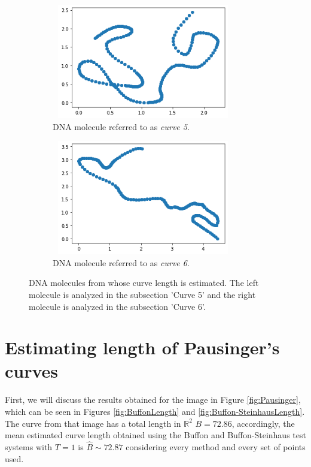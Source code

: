 \begin{figure}[h!]
  \begin{center}
  \begin{subfigure}[h!]{80mm}
    \includegraphics[width=80mm, height=50mm]{Figuras/Curva5.png}\par
    \caption{DNA molecule referred to as \textit{curve 5}.}
    \label{fig:Curva5}
  \end{subfigure}
  \hfill
  \begin{subfigure}[h!]{80mm}
    \includegraphics[width=80mm, height=50mm]{Figuras/Curva6.png}\par
    \caption{DNA molecule referred to as \textit{curve 6}.}
    \label{fig:Curva6}
  \end{subfigure}
  
  \caption{DNA molecules from \cite{adn.pdf} whose curve length is estimated. The left molecule is analyzed in the subsection 'Curve 5' and the right molecule is analyzed in the subsection 'Curve 6'.}
  \label{fig:Curvas_ADN}
  \end{center}
\end{figure}



\section{Estimating length of Pausinger's curves}
First, we will discuss the results obtained for the image in Figure \ref{fig:Pausinger}, which can be seen in Figures \ref{fig:BuffonLength} and \ref{fig:Buffon-SteinhausLength}. The curve from that image has a total length in $\mathbb{R}^2$ $B=72.86$, accordingly, the mean estimated curve length obtained using the Buffon and Buffon-Steinhaus test systems with $T=1$ is $\widehat{B} \sim 72.87$ considering every method and every set of points used.\\

